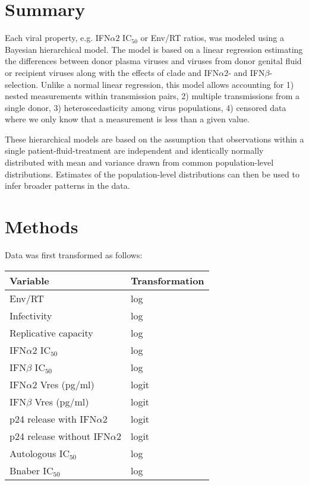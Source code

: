 \documentclass[12pt]{article}
\newcommand{\ifna}{IFN${\alpha 2}$}
\newcommand{\ifnb}{IFN${\beta}$}
\newcommand{\icFifty}{IC$_{50}$}
\begin{document}
\section*{Summary}
Each viral property, e.g. \ifna{} \icFifty{} or Env/RT ratios, was modeled using a Bayesian hierarchical model.
  The model is based on a linear regression estimating the differences between
  donor plasma viruses and viruses from donor genital fluid or recipient viruses along with the effects of clade and \ifna{}- and \ifnb{}-selection.
  Unlike a normal linear regression, this model allows accounting for
  1) nested measurements within transmission pairs,
  2) multiple transmissions from a single donor,
  3) heteroscedasticity among virus populations, 
  4) censored data where we only know that a measurement is less than a given value.

These hierarchical models are based on the assumption that observations within a single patient-fluid-treatment
  are independent and identically normally distributed with mean and variance drawn from common population-level distributions.
  Estimates of the population-level distributions can then be used to infer broader patterns in the data.

\section*{Methods}

Data was first transformed as follows:

\begin{table}[ht]
\centering
\begin{tabular}{|l|l|}
      \hline
      Variable                    & Transformation \\ 
      \hline
      Env/RT                      & log            \\ 
      Infectivity                 & log            \\ 
      Replicative capacity        & log            \\ 
      \ifna{} \icFifty{}          & log            \\ 
      \ifnb{} \icFifty{}          & log            \\ 
      \ifna{} Vres (pg/ml)        & logit          \\ 
      \ifnb{} Vres (pg/ml)        & logit          \\ 
      p24 release with \ifna{}    & logit          \\ 
      p24 release without \ifna{} & logit          \\ 
      Autologous \icFifty{}       & log            \\ 
      Bnaber \icFifty{}           & log            \\ 
      \hline
\end{tabular}
\end{table}
\end{document}
